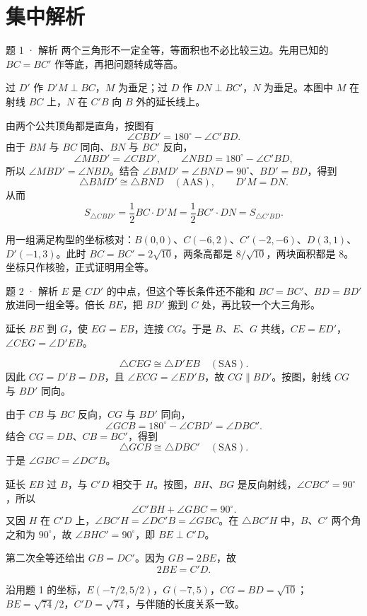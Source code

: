 \section{集中解析}
\begin{solution}{题 1 · 解析}
\think 两个三角形不一定全等，等面积也不必比较三边。先用已知的 \(BC=BC'\) 作等底，再把问题转成等高。

\solve 过 \(D'\) 作 \(D'M\perp BC\)，\(M\) 为垂足；过 \(D\) 作 \(DN\perp BC'\)，\(N\) 为垂足。本图中 \(M\) 在射线 \(BC\) 上，\(N\) 在 \(C'B\) 向 \(B\) 外的延长线上。
\diagram{\diArea}

由两个公共顶角都是直角，按图有
\[
\angle CBD'=180^\circ-\angle C'BD.
\]
由于 \(BM\) 与 \(BC\) 同向、\(BN\) 与 \(BC'\) 反向，
\[
\angle MBD'=\angle CBD',\qquad
\angle NBD=180^\circ-\angle C'BD,
\]
所以 \(\angle MBD'=\angle NBD\)。结合 \(\angle BMD'=\angle BND=90^\circ\)、\(BD'=BD\)，得到
\[
\triangle BMD'\cong\triangle BND\quad(\mathrm{AAS}),\qquad D'M=DN.
\]
从而
\[
S_{\triangle CBD'}=\frac12 BC\cdot D'M
=\frac12 BC'\cdot DN=S_{\triangle C'BD}.
\]

\checkup 用一组满足构型的坐标核对：\(B(0,0)\)、\(C(-6,2)\)、\(C'(-2,-6)\)、\(D(3,1)\)、\(D'(-1,3)\)。此时 \(BC=BC'=2\sqrt{10}\)，两条高都是 \(8/\sqrt{10}\)，两块面积都是 \(8\)。坐标只作核验，正式证明用全等。
\end{solution}
\clearpage

\begin{solution}{题 2 · 解析}
\think \(E\) 是 \(CD'\) 的中点，但这个等长条件还不能和 \(BC=BC'\)、\(BD=BD'\) 放进同一组全等。倍长 \(BE\)，把 \(BD'\) 搬到 \(C\) 处，再比较一个大三角形。

\solve 延长 \(BE\) 到 \(G\)，使 \(EG=EB\)，连接 \(CG\)。于是 \(B\)、\(E\)、\(G\) 共线，\(CE=ED'\)，\(\angle CEG=\angle D'EB\)。
\diagram{\diMidpoint}

\[
\triangle CEG\cong\triangle D'EB\quad(\mathrm{SAS}).
\]
因此 \(CG=D'B=DB\)，且 \(\angle ECG=\angle ED'B\)，故 \(CG\parallel BD'\)。按图，射线 \(CG\) 与 \(BD'\) 同向。

由于 \(CB\) 与 \(BC\) 反向，\(CG\) 与 \(BD'\) 同向，
\[
\angle GCB=180^\circ-\angle CBD'=\angle DBC'.
\]
结合 \(CG=DB\)、\(CB=BC'\)，得到
\[
\triangle GCB\cong\triangle DBC'\quad(\mathrm{SAS}).
\]
于是 \(\angle GBC=\angle DC'B\)。

延长 \(EB\) 过 \(B\)，与 \(C'D\) 相交于 \(H\)。按图，\(BH\)、\(BG\) 是反向射线，\(\angle CBC'=90^\circ\)，所以
\[
\angle C'BH+\angle GBC=90^\circ.
\]
又因 \(H\) 在 \(C'D\) 上，\(\angle BC'H=\angle DC'B=\angle GBC\)。在 \(\triangle BC'H\) 中，\(B\)、\(C'\) 两个角之和为 \(90^\circ\)，故 \(\angle BHC'=90^\circ\)，即 \(BE\perp C'D\)。

第二次全等还给出 \(GB=DC'\)。因为 \(GB=2BE\)，故
\[
\boxed{2BE=C'D}.
\]

\checkup 沿用题 1 的坐标，\(E(-7/2,5/2)\)，\(G(-7,5)\)，\(CG=BD=\sqrt{10}\)；\(BE=\sqrt{74}/2\)，\(C'D=\sqrt{74}\)，与伴随的长度关系一致。
\end{solution}
\clearpage

